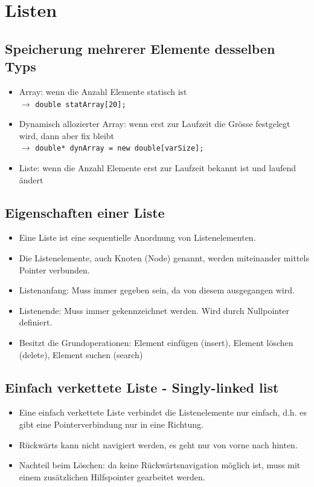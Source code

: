 \section{Listen}
\subsection{Speicherung mehrerer Elemente desselben Typs}
\begin{itemize}
  \item Array: wenn die Anzahl Elemente statisch ist \\ $\rightarrow$  \lstinline{double statArray[20];}
  \item Dynamisch allozierter Array: wenn erst zur Laufzeit die Grösse festgelegt wird, dann aber fix bleibt \\ $\rightarrow$
  \lstinline{double* dynArray = new double[varSize];}
  \item Liste: wenn die Anzahl Elemente erst zur Laufzeit bekannt ist und laufend ändert
\end{itemize}

\subsection{Eigenschaften einer Liste}
\begin{itemize}
  \item Eine Liste ist eine sequentielle Anordnung von Listenelementen.
  \item Die Listenelemente, auch Knoten (Node) genannt, werden miteinander mittels Pointer verbunden.
  \item Listenanfang: Muss immer gegeben sein, da von diesem ausgegangen wird.
  \item Listenende: Muss immer gekennzeichnet werden. Wird durch Nullpointer definiert.
  \item Besitzt die Grundoperationen: Element einfügen (insert), Element löschen (delete), Element suchen (search)
\end{itemize}

\subsection{Einfach verkettete Liste - Singly-linked list}
\begin{itemize}
  \item Eine einfach verkettete Liste verbindet die Listenelemente nur einfach, d.h. es gibt eine Pointerverbindung nur in eine Richtung.
  \item Rückwärts kann nicht navigiert werden, es geht nur von vorne nach hinten.
  \item Nachteil beim Löschen: da keine Rückwärtsnavigation möglich ist, muss mit einem zusätzlichen Hilfspointer gearbeitet werden.
\end{itemize}

